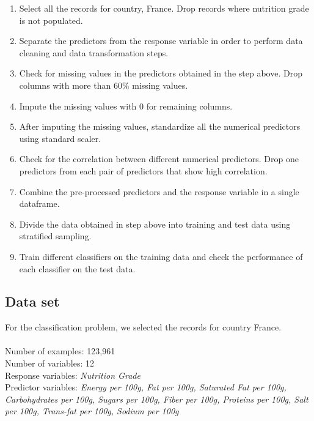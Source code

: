\documentclass[sigconf]{acmart}
\begin{document}
\begin{enumerate}
  \item Select all the records for country, France. Drop records where nutrition grade is not populated.
  \item Separate the predictors from the response variable in order to perform data cleaning and data transformation steps.
  \item Check for missing values in the predictors obtained in the step above. Drop columns with more than 60\% missing values.
   \item Impute the missing values with 0 for remaining columns.
   \item After imputing the missing values, standardize all the numerical predictors using standard scaler.
   \item Check for the correlation between different numerical predictors. Drop one predictors from each pair of predictors that show high correlation.
   \item Combine the pre-processed predictors and the response variable in a single dataframe.
   \item Divide the data obtained in step above into training and test data using stratified sampling.
   \item Train different classifiers on the training data and check the performance of each classifier on the test data.
\end{enumerate}

\subsection{Data set}
For the classification problem, we selected the records for country France. \\ \\
Number of examples: 123,961 \\
Number of variables: 12 \\
Response variables: {\em Nutrition Grade} \\
Predictor variables: {\em Energy per 100g, Fat per 100g, Saturated Fat per 100g, Carbohydrates per 100g, Sugars per 100g, Fiber per 100g, Proteins per 100g, Salt per 100g, Trans-fat per 100g, Sodium per 100g}
\end{document}
